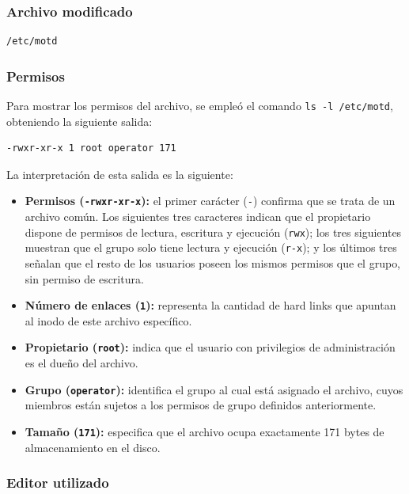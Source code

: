 \documentclass[12pt,spanish]{article}
\begin{document}
\subsubsection*{Archivo modificado}

\begin{verbatim}
/etc/motd
\end{verbatim}

\subsubsection*{Permisos}
Para mostrar los permisos del archivo, se empleó el comando \texttt{ls -l /etc/motd}, obteniendo la siguiente salida:
\begin{verbatim}
-rwxr-xr-x 1 root operator 171
\end{verbatim}

La interpretación de esta salida es la siguiente:

\begin{itemize}
    \item \textbf{Permisos (\texttt{-rwxr-xr-x}):} el primer carácter (\texttt{-}) confirma que se trata de un archivo común. Los siguientes tres caracteres indican que el propietario dispone de permisos de lectura, escritura y ejecución (\texttt{rwx}); los tres siguientes muestran que el grupo solo tiene lectura y ejecución (\texttt{r-x}); y los últimos tres señalan que el resto de los usuarios poseen los mismos permisos que el grupo, sin permiso de escritura.
    \item \textbf{Número de enlaces (\texttt{1}):} representa la cantidad de hard links que apuntan al inodo de este archivo específico.
    \item \textbf{Propietario (\texttt{root}):} indica que el usuario con privilegios de administración es el dueño del archivo.
    \item \textbf{Grupo (\texttt{operator}):} identifica el grupo al cual está asignado el archivo, cuyos miembros están sujetos a los permisos de grupo definidos anteriormente.
    \item \textbf{Tamaño (\texttt{171}):} especifica que el archivo ocupa exactamente 171 bytes de almacenamiento en el disco.
\end{itemize}

\subsubsection*{Editor utilizado}
\end{document}
